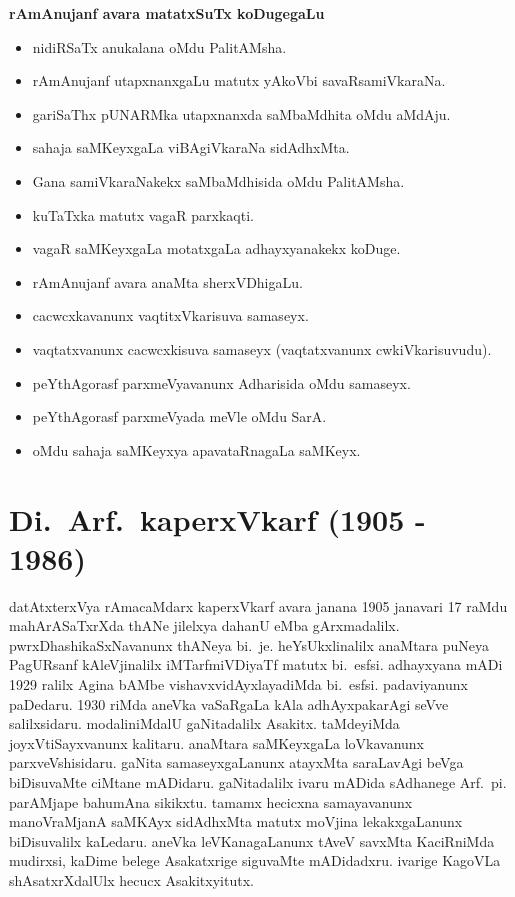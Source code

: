 \textbf{rAmAnujanf avara matatxSuTx koDugegaLu}
\begin{itemize}
\item nidiRSaTx anukalana oMdu PalitAMsha.
\item rAmAnujanf utapxnanxgaLu matutx yAkoVbi savaRsamiVkaraNa.
\item gariSaThx pUNARMka utapxnanxda saMbaMdhita oMdu aMdAju.
\item sahaja saMKeyxgaLa viBAgiVkaraNa sidAdhxMta.
\item Gana samiVkaraNakekx saMbaMdhisida oMdu PalitAMsha.
\item kuTaTxka matutx vagaR parxkaqti.
\item vagaR saMKeyxgaLa motatxgaLa adhayxyanakekx koDuge.
\item rAmAnujanf avara anaMta sherxVDhigaLu.
\item cacwcxkavanunx vaqtitxVkarisuva samaseyx.
\item vaqtatxvanunx cacwcxkisuva samaseyx (vaqtatxvanunx cwkiVkarisuvudu).
\item peYthAgorasf parxmeVyavanunx Adharisida oMdu samaseyx.
\item peYthAgorasf parxmeVyada meVle oMdu SarA.
\item oMdu sahaja saMKeyxya apavataRnagaLa saMKeyx.
\end{itemize}

\section{{\protect\bf Di.~Arf.\ kaperxVkarf  {\rm (1905 - 1986)}}}

\vskip -0.2cm

datAtxterxVya rAmacaMdarx kaperxVkarf avara janana {\rm 1905} janavari {\rm 17} raMdu mahArASaTxrXda thANe jilelxya dahanU eMba gArxmadalilx. pwrxDhashikaSxNavanunx thANeya bi.~je. heYsUkxli\break nalilx anaMtara puNeya PagURsanf kAleVjinalilx iMTarfmiVDiyaTf matutx bi.~esfsi. adhayxyana mADi {\rm 1929} ralilx Agina bAMbe vishavxvidAyxlayadiMda bi.~esfsi. padavi\break yanunx paDedaru. {\rm 1930} riMda aneVka vaSaRgaLa kAla adhAyxpakarAgi seVve salilxsidaru. modaliniMdalU gaNitadalilx Asakitx. taMdeyiMda joyxVtiSayxvanunx kalitaru. anaMtara saMKeyxgaLa loVkavanunx parxveVshisidaru. gaNita samaseyxgaLanunx atayxMta saraLavAgi beVga biDisuvaMte ciMtane mADidaru. gaNitadalilx ivaru mADida sAdhanege Arf.~pi. parAMjape bahumAna sikikxtu. tamamx hecicxna samayavanunx manoVraMjanA saMKAyx sidAdhxMta matutx moVjina lekakxgaLanunx biDisuvalilx kaLedaru. aneVka leVKanagaLanunx tAveV savxMta KaciRniMda mudirxsi, kaDime belege Asakatxrige siguvaMte mADidadxru. ivarige KagoVLa shAsatxrXdalUlx hecucx Asakitxyitutx. 

